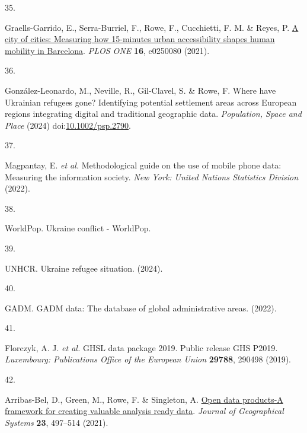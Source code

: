 \documentclass[
  11pt,
]{article}
\newlength{\cslhangindent}
\newlength{\csllabelwidth}
\newenvironment{CSLReferences}[2] %
 {\begin{list}{}{%
  \setlength{\itemindent}{0pt}
  \setlength{\leftmargin}{0pt}
  \setlength{\parsep}{0pt}
  \ifodd #1
   \setlength{\leftmargin}{\cslhangindent}
   \setlength{\itemindent}{-1\cslhangindent}
  \fi
  \setlength{\itemsep}{#2\baselineskip}}}
 {\end{list}}
\newcommand{\CSLLeftMargin}[1]{\parbox[t]{\csllabelwidth}{\strut#1\strut}}
\newcommand{\CSLRightInline}[1]{\parbox[t]{\linewidth - \csllabelwidth}{\strut#1\strut}}
\begin{document}
\begin{CSLReferences}{0}{0}
\CSLLeftMargin{35. }%
\CSLRightInline{Graells-Garrido, E., Serra-Burriel, F., Rowe, F.,
Cucchietti, F. M. \& Reyes, P.
\href{https://doi.org/10.1371/journal.pone.0250080}{A city of cities:
Measuring how 15-minutes urban accessibility shapes human mobility in
Barcelona}. \emph{PLOS ONE} \textbf{16}, e0250080 (2021).}

\CSLLeftMargin{36. }%
\CSLRightInline{González-Leonardo, M., Neville, R., Gil-Clavel, S. \&
Rowe, F. Where have Ukrainian refugees gone? Identifying potential
settlement areas across European regions integrating digital and
traditional geographic data. \emph{Population, Space and Place} (2024)
doi:\href{https://doi.org/10.1002/psp.2790}{10.1002/psp.2790}.}

\CSLLeftMargin{37. }%
\CSLRightInline{Magpantay, E. \emph{et al.} Methodological guide on the
use of mobile phone data: Measuring the information society. \emph{New
York: United Nations Statistics Division} (2022).}

\CSLLeftMargin{38. }%
\CSLRightInline{WorldPop. Ukraine conflict - {WorldPop}.}

\CSLLeftMargin{39. }%
\CSLRightInline{UNHCR. Ukraine refugee situation. (2024).}

\CSLLeftMargin{40. }%
\CSLRightInline{GADM. {GADM} data: The database of global administrative
areas. (2022).}

\CSLLeftMargin{41. }%
\CSLRightInline{Florczyk, A. J. \emph{et al.} {GHSL data package 2019.
Public release GHS P2019}. \emph{{Luxembourg: Publications Office of the
European Union}} \textbf{29788}, 290498 (2019).}

\CSLLeftMargin{42. }%
\CSLRightInline{Arribas-Bel, D., Green, M., Rowe, F. \& Singleton, A.
\href{https://doi.org/10.1007/s10109-021-00363-5}{Open data products-A
framework for creating valuable analysis ready data}. \emph{Journal of
Geographical Systems} \textbf{23}, 497--514 (2021).}

\end{CSLReferences}
\end{document}
